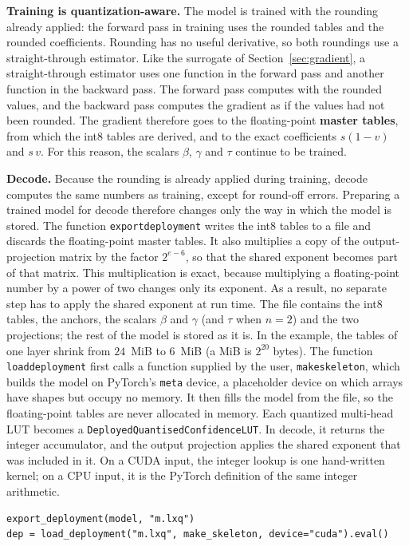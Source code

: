 \documentclass[11pt]{article}
\DeclareRobustCommand{\code}[1]{{\renewcommand{\_}{\textunderscore\allowbreak}\texttt{#1}}}
\newcommand{\term}[1]{\textbf{#1}}
\begin{document}
\textbf{Training is quantization-aware.} The model is trained with the rounding already applied: the
forward pass in training uses the rounded tables and the rounded coefficients. Rounding has no useful
derivative, so both roundings use a straight-through estimator. Like the surrogate of
Section~\ref{sec:gradient}, a straight-through estimator uses one function in the forward pass and
another function in the backward pass. The forward pass computes with the rounded values, and the
backward pass computes the gradient as if the values had not been rounded. The gradient therefore goes to
the floating-point \term{master tables}, from which the int8 tables are derived, and to the exact
coefficients $s(1-v)$ and $s\,v$. For this reason, the scalars $\beta$, $\gamma$ and $\tau$ continue to
be trained.

\textbf{Decode.} Because the rounding is already applied during training, decode computes the same
numbers as training, except for round-off errors. Preparing a trained model for decode therefore changes
only the way in which the model is stored. The function \code{export\_deployment} writes the int8 tables
to a file and discards the floating-point master tables. It also multiplies a copy of the
output-projection matrix by the factor $2^{e-6}$, so that the shared exponent becomes part of that
matrix. This multiplication is exact, because multiplying a floating-point number by a power of two
changes only its exponent. As a result, no separate step has to apply the shared exponent at run time.
The file contains the int8 tables, the anchors, the scalars $\beta$ and $\gamma$ (and $\tau$ when $n=2$)
and the two projections; the rest of the model is stored as it is. In the example, the tables of one
layer shrink from $24$~MiB to $6$~MiB (a MiB is $2^{20}$ bytes). The function \code{load\_deployment}
first calls a function supplied by the user, \code{make\_skeleton}, which builds the model on PyTorch's
\code{meta} device, a placeholder device on which arrays have shapes but occupy no memory. It then fills
the model from the file, so the floating-point tables are never allocated in memory. Each quantized
multi-head LUT becomes a \code{DeployedQuantisedConfidenceLUT}. In decode, it returns the integer
accumulator, and the output projection applies the shared exponent that was included in it. On a CUDA
input, the integer lookup is one hand-written kernel; on a CPU input, it is the PyTorch definition of the
same integer arithmetic.
\begin{lstlisting}
export_deployment(model, "m.lxq")
dep = load_deployment("m.lxq", make_skeleton, device="cuda").eval()
\end{lstlisting}
\end{document}
